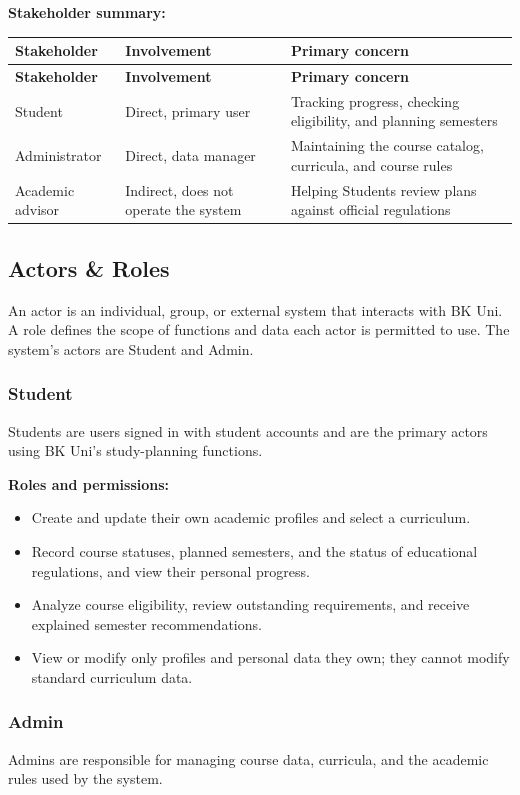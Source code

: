 \textbf{Stakeholder summary:}
\begin{longtable}{|p{}|p{}|p{}|}
\hline
\textbf{Stakeholder} & \textbf{Involvement} & \textbf{Primary concern} \\
\hline
\endfirsthead
\hline
\textbf{Stakeholder} & \textbf{Involvement} & \textbf{Primary concern} \\
\hline
\endhead
Student & Direct, primary user & Tracking progress, checking eligibility, and planning semesters \\
\hline
Administrator & Direct, data manager & Maintaining the course catalog, curricula, and course rules \\
\hline
Academic advisor & Indirect, does not operate the system & Helping Students review plans against official regulations \\
\hline
\end{longtable}

\subsection{Actors \& Roles}

An actor is an individual, group, or external system that interacts with BK Uni. A role defines the scope of functions and data each actor is permitted to use. The system's actors are Student and Admin.

\subsubsection{Student}
Students are users signed in with student accounts and are the primary actors using BK Uni's study-planning functions.

\textbf{Roles and permissions:}
\begin{itemize}
    \item Create and update their own academic profiles and select a curriculum.
    \item Record course statuses, planned semesters, and the status of educational regulations, and view their personal progress.
    \item Analyze course eligibility, review outstanding requirements, and receive explained semester recommendations.
    \item View or modify only profiles and personal data they own; they cannot modify standard curriculum data.
\end{itemize}

\subsubsection{Admin}
Admins are responsible for managing course data, curricula, and the academic rules used by the system.

